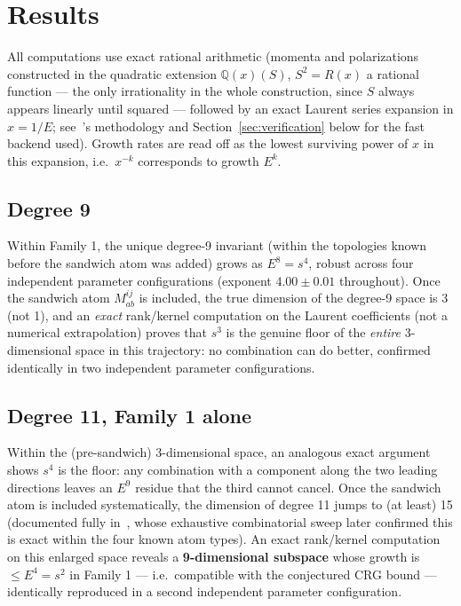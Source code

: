 \documentclass[reqno]{amsart}
\newcommand{\Q}{\mathbb{Q}}
\begin{document}
\section{Results}
\label{sec:results}

All computations use exact rational arithmetic (momenta and polarizations constructed in the
quadratic extension $\Q(x)(S)$, $S^2=R(x)$ a rational function --- the only irrationality in the
whole construction, since $S$ always appears linearly until squared --- followed by an exact
Laurent series expansion in $x=1/E$; see~\cite{fivephotons}'s methodology and
Section~\ref{sec:verification} below for the fast backend used). Growth rates are read off as the
lowest surviving power of $x$ in this expansion, i.e.\ $x^{-k}$ corresponds to growth $E^k$.

\subsection{Degree 9}

Within Family 1, the unique degree-9 invariant (within the topologies known before the sandwich
atom was added) grows as $E^8=s^4$, robust across four independent parameter configurations
(exponent $4.00\pm0.01$ throughout). Once the sandwich atom $M^{ij}_{ab}$ is included, the true
dimension of the degree-9 space is 3 (not 1), and an \emph{exact} rank/kernel computation on the
Laurent coefficients (not a numerical extrapolation) proves that $s^3$ is the genuine floor of the
\emph{entire} 3-dimensional space in this trajectory: no combination can do better, confirmed
identically in two independent parameter configurations.

\subsection{Degree 11, Family 1 alone}

Within the (pre-sandwich) 3-dimensional space, an analogous exact argument shows $s^4$ is the
floor: any combination with a component along the two leading directions leaves an $E^9$ residue
that the third cannot cancel. Once the sandwich atom is included systematically, the dimension of
degree 11 jumps to (at least) 15 (documented fully in~\cite{fivephotons}, whose exhaustive
combinatorial sweep later confirmed this is exact within the four known atom types). An exact
rank/kernel computation on this enlarged space reveals a \textbf{9-dimensional subspace} whose
growth is $\leq E^4=s^2$ in Family 1 --- i.e.\ compatible with the conjectured CRG bound ---
identically reproduced in a second independent parameter configuration.
\end{document}
